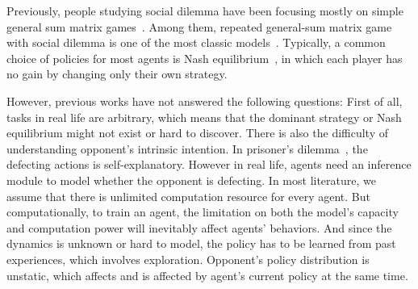 \documentclass{article}
\begin{document}
Previously, people studying social dilemma have been focusing mostly on simple general sum matrix games~\cite{tullock1974social}.
Among them, repeated general-sum matrix game with social dilemma is one of the most classic models~\cite{bouzy2010multi, leibo2017multi}.
Typically, a common choice of policies for most agents is Nash equilibrium~\cite{maskin1999Nash, tullock1974social, bouzy2010multi},
in which each player has no gain by changing only their own strategy.

However, previous works have not answered the following questions:
First of all, tasks in real life are arbitrary, which means that
the dominant strategy or Nash equilibrium might not exist or hard to discover.
There is also the difficulty of understanding opponent's intrinsic intention.
In prisoner's dilemma~\cite{nowak1993strategy}, the defecting actions is self-explanatory.
However in real life, agents need an inference module to model whether the opponent is defecting.
In most literature, we assume that there is unlimited computation resource for every agent.
But computationally, to train an agent,
the limitation on both the model's capacity and computation power will inevitably affect agents' behaviors.
And since the dynamics is unknown or hard to model,
the policy has to be learned from past experiences, which involves exploration.
Opponent's policy distribution is unstatic,
which affects and is affected by agent's current policy at the same time.
\end{document}
